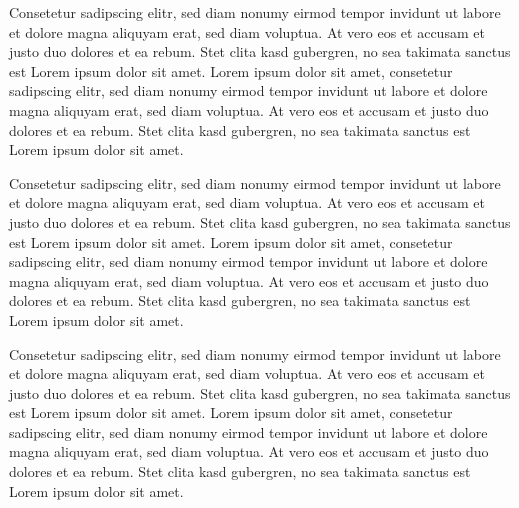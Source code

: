 \documentclass{../exercisesheet}
\begin{document}
\begin{exercise}{10}
	Consetetur sadipscing elitr, sed diam nonumy eirmod tempor invidunt ut labore et dolore magna aliquyam erat, sed diam voluptua. 
	At vero eos et accusam et justo duo dolores et ea rebum. Stet clita kasd gubergren, no sea takimata sanctus est Lorem ipsum dolor sit amet. 
	Lorem ipsum dolor sit amet, consetetur sadipscing elitr, sed diam nonumy eirmod tempor invidunt ut labore et dolore magna aliquyam erat, sed diam voluptua. 
	At vero eos et accusam et justo duo dolores et ea rebum. Stet clita kasd gubergren, no sea takimata sanctus est Lorem ipsum dolor sit amet. 
	
\end{exercise}

\begin{exercise}{20}
	Consetetur sadipscing elitr, sed diam nonumy eirmod tempor invidunt ut labore et dolore magna aliquyam erat, sed diam voluptua. 
	At vero eos et accusam et justo duo dolores et ea rebum. Stet clita kasd gubergren, no sea takimata sanctus est Lorem ipsum dolor sit amet. 
	Lorem ipsum dolor sit amet, consetetur sadipscing elitr, sed diam nonumy eirmod tempor invidunt ut labore et dolore magna aliquyam erat, sed diam voluptua. 
	At vero eos et accusam et justo duo dolores et ea rebum. Stet clita kasd gubergren, no sea takimata sanctus est Lorem ipsum dolor sit amet. 
	
\end{exercise}

\begin{exercise}{20}
	Consetetur sadipscing elitr, sed diam nonumy eirmod tempor invidunt ut labore et dolore magna aliquyam erat, sed diam voluptua. 
	At vero eos et accusam et justo duo dolores et ea rebum. Stet clita kasd gubergren, no sea takimata sanctus est Lorem ipsum dolor sit amet. 
	Lorem ipsum dolor sit amet, consetetur sadipscing elitr, sed diam nonumy eirmod tempor invidunt ut labore et dolore magna aliquyam erat, sed diam voluptua. 
	At vero eos et accusam et justo duo dolores et ea rebum. Stet clita kasd gubergren, no sea takimata sanctus est Lorem ipsum dolor sit amet. 
	
\end{exercise}
\end{document}

